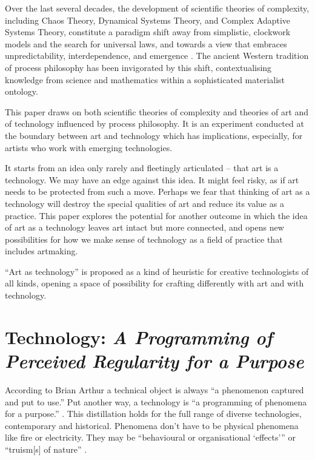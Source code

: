 \documentclass[letterpaper]{article}
\begin{document}
    Over the last several decades, the development of scientific theories of complexity, including Chaos Theory, Dynamical Systems Theory, and Complex Adaptive Systems Theory, constitute a paradigm shift away from simplistic, clockwork models and the search for universal laws, and towards a view that embraces unpredictability, interdependence, and emergence \citep{StengersOrdrOtOfChs1984}. The ancient Western tradition of process philosophy \citep{SeibtStnfrdEncyclpdPrcssPhlsphy1974} has been invigorated by this shift, contextualising knowledge from science and mathematics within a sophisticated materialist ontology.
    
    This paper draws on both scientific theories of complexity and theories of art and of technology influenced by process philosophy. It is an experiment conducted at the boundary between art and technology which has implications, especially, for artists who work with emerging technologies.
    
    It starts from an idea only rarely \citep[pp.74–75]{SauvagnarguesArtmchns2016} and fleetingly \citep[p.202]{ZepkeOSullivanDlzCntmprryArt2010} articulated – that art is a technology. We may have an edge against this idea. It might feel risky, as if art needs to be protected from such a move. Perhaps we fear that thinking of art as a technology will destroy the special qualities of art and reduce its value as a practice. This paper explores the potential for another outcome in which the idea of art as a technology leaves art intact but more connected, and opens new possibilities for how we make sense of technology as a field of practice that includes artmaking. 
    
    “Art as technology” is proposed as a kind of heuristic for creative technologists of all kinds, opening a space of possibility for crafting differently with art and with technology.

\section{Technology: \emph{A Programming of Perceived Regularity for a Purpose}} 

    According to Brian Arthur a technical object is always “a phenomenon captured and put to use.” \citep[p.53]{theNatureOfTechnology2009} Put another way, a technology is “a programming of phenomena for a purpose.” \citep[p.53]{theNatureOfTechnology2009}. This distillation holds for the full range of diverse technologies, contemporary and historical. Phenomena don't have to be physical phenomena like fire or electricity. They may be “behavioural or organisational ‘effects’” \citep[p.55]{theNatureOfTechnology2009} or “truism[s] of nature” \citep[p.45]{theNatureOfTechnology2009}.
\end{document}
